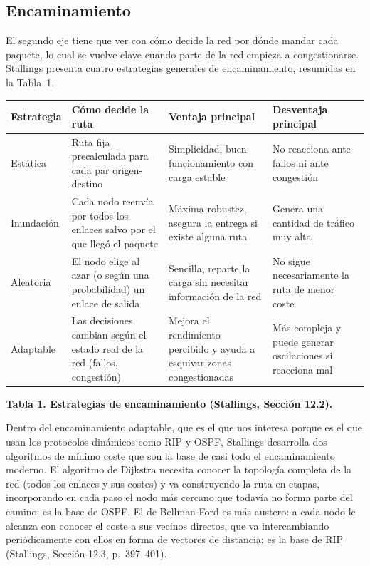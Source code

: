 \documentclass[11pt,a4paper]{article}
\newcommand{\figcaption}[1]{\par\noindent\footnotesize\textbf{#1}\par\vspace{0.4cm}}
\begin{document}
\subsection{Encaminamiento}
\label{sec:encaminamiento}

El segundo eje tiene que ver con c\'omo decide la red por d\'onde mandar cada paquete, lo cual se vuelve clave cuando parte de la red empieza a congestionarse. Stallings presenta cuatro estrategias generales de encaminamiento, resumidas en la Tabla~1.

\needspace{1cm}
\begin{center}
\begin{minipage}{0.96\linewidth}
\centering
\scriptsize
\renewcommand{\arraystretch}{0.85}
\begin{tabular}{@{}p{2.3cm}p{5.2cm}p{3cm}p{3.2cm}@{}}
\toprule
\textbf{Estrategia} & \textbf{C\'omo decide la ruta} & \textbf{Ventaja principal} & \textbf{Desventaja principal} \\
\midrule
Est\'atica & Ruta fija precalculada para cada par origen-destino & Simplicidad, buen funcionamiento con carga estable & No reacciona ante fallos ni ante congesti\'on \\
Inundaci\'on & Cada nodo reenv\'ia por todos los enlaces salvo por el que lleg\'o el paquete & M\'axima robustez, asegura la entrega si existe alguna ruta & Genera una cantidad de tr\'afico muy alta \\
Aleatoria & El nodo elige al azar (o seg\'un una probabilidad) un enlace de salida & Sencilla, reparte la carga sin necesitar informaci\'on de la red & No sigue necesariamente la ruta de menor coste \\
Adaptable & Las decisiones cambian seg\'un el estado real de la red (fallos, congesti\'on) & Mejora el rendimiento percibido y ayuda a esquivar zonas congestionadas & M\'as compleja y puede generar oscilaciones si reacciona mal \\
\bottomrule
\end{tabular}
\par\vspace{0.1cm}
\figcaption{Tabla 1. Estrategias de encaminamiento (Stallings, Secci\'on 12.2).}
\end{minipage}
\end{center}

Dentro del encaminamiento adaptable, que es el que nos interesa porque es el que usan los protocolos din\'amicos como RIP y OSPF, Stallings desarrolla dos algoritmos de m\'inimo coste que son la base de casi todo el encaminamiento moderno. El algoritmo de Dijkstra necesita conocer la topolog\'ia completa de la red (todos los enlaces y sus costes) y va construyendo la ruta en etapas, incorporando en cada paso el nodo m\'as cercano que todav\'ia no forma parte del camino; es la base de OSPF. El de Bellman-Ford es m\'as austero: a cada nodo le alcanza con conocer el coste a sus vecinos directos, que va intercambiando peri\'odicamente con ellos en forma de vectores de distancia; es la base de RIP (Stallings, Secci\'on 12.3, p.~397--401).
\end{document}
